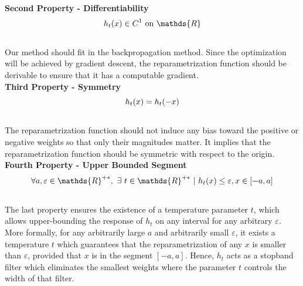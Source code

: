 \noindent\textbf{Second Property - Differentiability} \\
\begin{equation}
    \centering
    h_t(x) \in C^1 \text{ on } \mathds{R}
    \label{eqn:chap1:reparam_prop2}
\end{equation}
\\
Our method should fit in the backpropagation method. Since the optimization will
be achieved by gradient descent, the reparametrization function should be
derivable to ensure that it has a computable gradient.\\

\noindent\textbf{Third Property - Symmetry} \\

\begin{equation}
    \centering
    h_t(x) = h_t(-x)
    \label{eqn:chap1:reparam_prop3}
\end{equation}
\\
The reparametrization function should not induce any bias toward the positive or
negative weights so that only their magnitudes matter. It implies that the
reparametrization function should be symmetric with respect to the origin.\\


\noindent\textbf{Fourth Property - Upper Bounded Segment} \\

\begin{equation}
    \centering
    \forall a,\varepsilon \in\mathds{R}^{+\ast},~ \exists ~t
    \in\mathds{R}^{+\ast} ~ | ~ h_t(x) \leq \varepsilon, x \in [-a,a]
    \label{eqn:chap1:reparam_prop4}
\end{equation}
\\
The last property ensures the existence of a temperature parameter $t$, which
allows upper-bounding the response of $h_t$ on any interval for any arbitrary
$\varepsilon$. More formally, for any arbitrarily large $a$ and arbitrarily
small $\varepsilon$, it exists a temperature $t$ which guarantees that the
reparametrization of any $x$ is smaller than $\varepsilon$, provided that $x$ is
in the segment $[-a, a]$. Hence, $h_t$ acts as a stopband filter which
eliminates the smallest weights where the parameter $t$ controls the width of
that filter. \\



